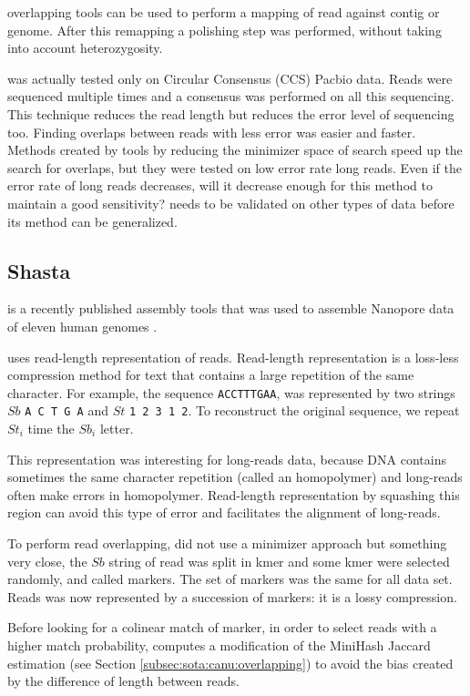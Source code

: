 \documentclass[main]{subfiles}
\begin{document}
\shimmer overlapping tools can be used to perform a mapping of read against contig or genome. After this remapping a polishing step was performed, without taking into account heterozygosity.

\peregrine was actually tested only on Circular Consensus (CCS) Pacbio data. Reads were sequenced multiple times and a consensus was performed on all this sequencing. This technique reduces the read length but reduces the error level of sequencing too. Finding overlaps between reads with less error was easier and faster. Methods created by \peregrine tools by reducing the minimizer space of search speed up the search for overlaps, but they were tested on low error rate long reads. Even if the error rate of long reads decreases, will it decrease enough for this method to maintain a good sensitivity? \peregrine needs to be validated on other types of data before its method can be generalized.

\subsection{Shasta}

\newcommand{\shasta}{}

\shasta is a recently published assembly tools that was used to assemble Nanopore data of eleven human genomes \cite{Shasta}.

\shasta uses read-length representation of reads. Read-length representation is a loss-less compression method for text that contains a large repetition of the same character. For example, the sequence \texttt{ACCTTTGAA}, was represented by two strings $Sb$ \texttt{A C T G A} and $St$ \texttt{1 2 3 1 2}. To reconstruct the original sequence, we repeat $St_i$ time the $Sb_i$ letter.

This representation was interesting for long-reads data, because DNA contains sometimes the same character repetition (called an homopolymer) and long-reads often make errors in homopolymer. Read-length representation by squashing this region can avoid this type of error and facilitates the alignment of long-reads.

To perform read overlapping, \shasta did not use a minimizer approach but something very close, the $Sb$ string of read was split in kmer and some kmer were selected randomly, and called markers. The set of markers was the same for all data set. Reads was now represented by a succession of markers: it is a lossy compression.

Before looking for a colinear match of marker, in order to select reads with a higher match probability, \shasta computes a modification of the MiniHash Jaccard estimation (see Section \ref{subsec:sota:canu:overlapping}) to avoid the bias created by the difference of length between reads.
\end{document}
